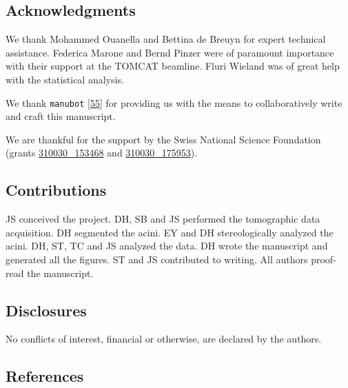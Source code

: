 \documentclass[
  american,
]{article}
\begin{document}
\hypertarget{acknowledgments}{%
\subsection{Acknowledgments}\label{acknowledgments}}

We thank Mohammed Ouanella and Bettina de Breuyn for expert technical assistance.
Federica Marone and Bernd Pinzer were of paramount importance with their support at the TOMCAT beamline.
Fluri Wieland was of great help with the statistical analysis.

We thank \texttt{manubot} {[}\protect\hyperlink{ref-YuJbg3zO}{55}{]} for providing us with the means to collaboratively write and craft this manuscript.

We are thankful for the support by the Swiss National Science Foundation (grants \href{http://p3.snf.ch/project-153468}{310030\_153468} and \href{http://p3.snf.ch/project-175953}{310030\_175953}).

\hypertarget{contributions}{%
\subsection{Contributions}\label{contributions}}

JS conceived the project.
DH, SB and JS performed the tomographic data acquisition.
DH segmented the acini.
EY and DH stereologically analyzed the acini.
DH, ST, TC and JS analyzed the data.
DH wrote the manuscript and generated all the figures.
ST and JS contributed to writing.
All authors proof-read the manuscript.

\hypertarget{disclosures}{%
\subsection{Disclosures}\label{disclosures}}

No conﬂicts of interest, financial or otherwise, are declared by the authors.

\hypertarget{references}{%
\subsection{References}\label{references}}
\end{document}
